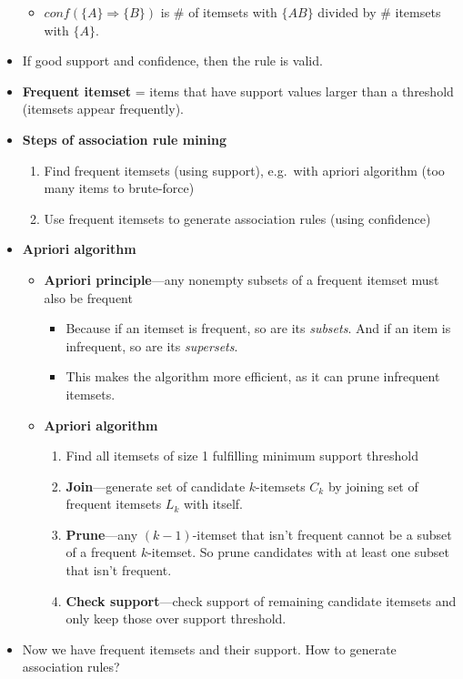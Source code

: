 \begin{multicols}{2}
\begin{itemize}
  \begin{itemize}
    \item
    \(conf(\{A\}\Rightarrow \{B\})\) is \# of itemsets with \(\{AB\}\)
    divided by \# itemsets with \(\{A\}\).
  \end{itemize}
\item
  If good support and confidence, then the rule is valid.
\item
  \textbf{Frequent itemset} = items that have support values larger than
  a threshold (itemsets appear frequently).
\item
  \textbf{Steps of association rule mining}

  \begin{enumerate}
  \def\labelenumi{\arabic{enumi}.}
    \item
    Find frequent itemsets (using support), e.g.~with apriori algorithm
    (too many items to brute-force)
  \item
    Use frequent itemsets to generate association rules (using
    confidence)
  \end{enumerate}
\item
  \textbf{Apriori algorithm}

  \begin{itemize}
    \item
    \textbf{Apriori principle}---any nonempty subsets of a frequent
    itemset must also be frequent

    \begin{itemize}
        \item
      Because if an itemset is frequent, so are its \emph{subsets}. And
      if an item is infrequent, so are its \emph{supersets}.
    \item
      This makes the algorithm more efficient, as it can prune
      infrequent itemsets.
    \end{itemize}
  \item
    \textbf{Apriori algorithm}

    \begin{enumerate}
    \def\labelenumi{\arabic{enumi}.}
        \item
      Find all itemsets of size 1 fulfilling minimum support threshold
    \item
      \textbf{Join}---generate set of candidate \(k\)-itemsets \(C_{k}\)
      by joining set of frequent itemsets \(L_{k}\) with itself.
    \item
      \textbf{Prune}---any \((k-1)\)-itemset that isn't frequent cannot
      be a subset of a frequent \(k\)-itemset. So prune candidates with
      at least one subset that isn't frequent.
    \item
      \textbf{Check support}---check support of remaining candidate
      itemsets and only keep those over support threshold.
    \end{enumerate}
  \end{itemize}
\item
  Now we have frequent itemsets and their support. How to generate
  association rules?


\end{itemize}
\end{multicols}
